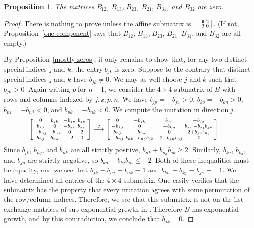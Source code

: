 \documentclass[10pt]{article}
\newtheorem{proposition}{Proposition}[section]
\theoremstyle{definition}
\theoremstyle{remark}
\numberwithin{equation}{section}
\newcommand{\0}{{\mathbf{0}}}
\begin{document}
\begin{proposition}\label{really zero}
The matrices $B_{12}$, $B_{13}$, $B_{23}$, $B_{21}$, $B_{31}$, and $B_{32}$ are zero.
\end{proposition}
\begin{proof}
There is nothing to prove unless the affine submatrix is $\begin{bsmallmatrix*}[r]0&2\\-2&0\end{bsmallmatrix*}$.
(If not, Proposition~\ref{one component} says that $B_{12}$, $B_{13}$, $B_{23}$, $B_{21}$, $B_{31}$, and $B_{32}$ are all empty.)

By Proposition~\ref{mostly zeros}, it only remains to show that, for any two distinct special indices $j$ and $k$, the entry $b_{jk}$ is zero.
Suppose to the contrary that distinct special indices $j$ and $k$ have $b_{jk}\neq0$.
We may as well choose $j$ and $k$ such that $b_{jk}>0$.
Again writing $p$ for $n-1$, we consider the $4\times4$ submatrix of $B$ with rows and columns indexed by $j,k,p,n$.
We have $b_{jp}=-b_{jn}>0$, $b_{kp}=-b_{kn}>0$, $b_{pj}=-b_{nj}<0$, and $b_{pk}=-b_{nk}<0$.
We compute the mutation in direction $j$.
\begin{align*}
\begin{bsmallmatrix*}
0&b_{jk}&-b_{jn}&b_{jn}\\
b_{kj}&0&-b_{kn}&b_{kn}\\
-b_{nj}&-b_{nk}&0&2\\
b_{nj}&b_{nk}&-2&0
\end{bsmallmatrix*}
&\overset{j}{\longrightarrow}
\begin{bsmallmatrix*}
0&-b_{jk}&b_{jn}&-b_{jn}\\
-b_{kj}&0&-b_{kn}&b_{kn}-b_{kj}b_{jn}\\
b_{nj}&-b_{nk}&0&2+b_{jn}b_{nj}\\
-b_{nj}&b_{nk}+b_{nj}b_{jk}&-2-b_{jn}b_{nj}&0
\end{bsmallmatrix*}
\end{align*}
Since $b_{jk}$, $b_{nj}$, and $b_{nk}$ are all strictly positive, $b_{nk}+b_{nj}b_{jk}\ge2$.
Similarly, $b_{kn}$, $b_{kj}$, and $b_{jn}$ are strictly negative, so $b_{kn}-b_{kj}b_{jn}\le-2$.
Both of these inequalities must be equality, and we see that $b_{jk}=b_{nj}=b_{nk}=1$ and $b_{kn}=b_{kj}=b_{jn}=-1$.
We have determined all entries of the $4\times 4$ submatrix.
One easily verifies that the submatrix has the property that every mutation agrees with some permutation of the row/column indices.  
Therefore, we see that this submatrix is not on the list exchange matrices of sub-exponential growth in \cite[Theorem~1.1]{FeShThTu12}.
Therefore $B$ has exponential growth, and by this contradiction, we conclude that $b_{jk}=0$.
\end{proof}
\end{document}
